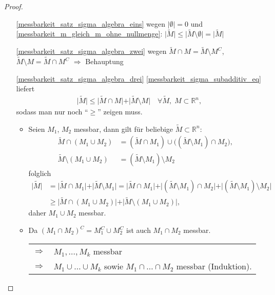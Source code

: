 \begin{proof}\hspace*{0pt}
	\begin{itemize}[topsep=\dimexpr-\baselineskip / 2\relax]
		\item[\ref{messbarkeit_satz_sigma_algebra_eins}] wegen $\vert\emptyset\vert = 0$ und \eqref{messbarkeit_m_gleich_m_ohne_nullmenge}: $\vert \tilde{M}\vert \le \vert\tilde{M}\setminus\emptyset\vert = \vert\tilde{M}\vert$
		
		\item[\ref{messbarkeit_satz_sigma_algebra_zwei}] wegen $\tilde{M}\cap M = \tilde{M}\setminus M^C$, $\tilde{M}\setminus M = \tilde{M}\cap M^C$ $\Rightarrow$ Behauptung
	
		\item[\ref{messbarkeit_satz_sigma_algebra_drei}] \eqref{messbarkeit_sigma_subadditiv_eq} liefert \begin{align*}
			\vert\tilde{M}\vert \le \vert \tilde{M}\cap M\vert + \vert\tilde{M}\setminus M\vert \quad\forall \tilde{M}, \;M\subset\mathbb{R}^n,
		\end{align*}
		sodass man nur noch "`$\ge$"' zeigen muss.
		
		\begin{itemize}
		
			\item Seien $M_1$, $M_2$ messbar, dann gilt für beliebige $\tilde{M}\subset\mathbb{R}^n$: \begin{align*}
				\tilde{M}\cap (M_1\cup M_2) &=(\tilde{M}\cap M_1)\cup \big( (\tilde{M}\setminus M_1)\cap M_2 \big), \\
				\tilde{M}\setminus (M_1\cup M_2) &= (\tilde{M}\setminus M_1)\setminus M_2
			\end{align*}
			folglich \begin{align*}
				\vert \tilde{M}\vert &= \vert \tilde{M}\cap M_1\vert + \vert \tilde{M}\setminus M_1 \vert = \vert\tilde{M}\cap M_1\vert + \vert (\tilde{M}\setminus M_1)\cap M_2\vert + \vert (\tilde{M}\setminus M_1)\setminus M_2\vert \\
				&\ge \vert \tilde{M}\cap (M_1\cup M_2)\vert + \vert \tilde{M} \setminus (M_1\cup M_2) \vert,
			\end{align*}
			daher $M_1\cup M_2$ messbar.
			
			\item Da $(M_1\cap M_2)^C = M_1^C\cup M_2^C$ ist auch $M_1\cap M_2$ messbar.\\
			\begin{tabularx}{\linewidth}{r@{\ \ }X}
				$\Rightarrow$ & $M_1,\dotsc,M_k$ messbar \\
				$\Rightarrow$ & $M_1\cup \dotsc\cup M_k$ sowie $M_1\cap\dotsc\cap M_2$ messbar (Induktion).
			\end{tabularx}
		

\end{itemize}
\end{itemize}
\end{proof}
